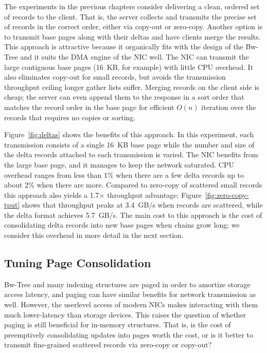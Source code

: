 The experiments in the previous chapters consider delivering a clean, ordered set of records to the
client. That is, the server collects and transmits the precise set of records
in the correct order, either via copy-out or zero-copy. Another option is to
transmit base pages along with their deltas and have clients merge the results.
This approach is attractive because it organically fits with the design of the
Bw-Tree and it suits the DMA engine of the NIC well.  The NIC can transmit the
large contiguous base pages (16~KB, for example) with little CPU overhead.
It also eliminates copy-out for small records, but avoids the transmission
throughput ceiling longer gather lists suffer. %
Merging records on the client side is cheap; the server can even append them to
the response in a sort order that matches the record order in the base page for
efficient $O(n)$ iteration over the records that requires no copies or sorting.

Figure~\ref{fig:deltas} shows the benefits of this approach. In this
experiment, each transmission consists of a single 16~KB base page while the
number and size of the delta records attached to each transmission is varied.
The NIC benefits from the large base page, and it manages to keep the network
saturated. CPU overhead ranges from less than 1\% when there are a few delta
records up to about 2\% when there are more. Compared to zero-copy of scattered
small records this approach also yields a 1.7$\times$ throughput advantage;
Figure~\ref{fig:zero-copy-tput} shows that throughput peaks at 3.4~GB/s when
records are scattered, while the delta format achieves 5.7~GB/s.
The main cost to this approach is
the cost of consolidating delta records into new base pages when chains grow
long; we consider this overhead in more detail in the next section.


\subsection{Tuning Page Consolidation}
\label{sec:consolidation}


Bw-Tree and many indexing structures are paged in order to amortize storage
access latency, and paging can have similar benefits for network transmission
as well. However, the userlevel access of modern NICs makes interacting with
them much lower-latency than storage devices. This raises the question of
whether paging is still beneficial for in-memory structures. That is, is the
cost of preemptively consolidating updates into pages worth the cost, or is it
better to transmit fine-grained scattered records via zero-copy or copy-out?

